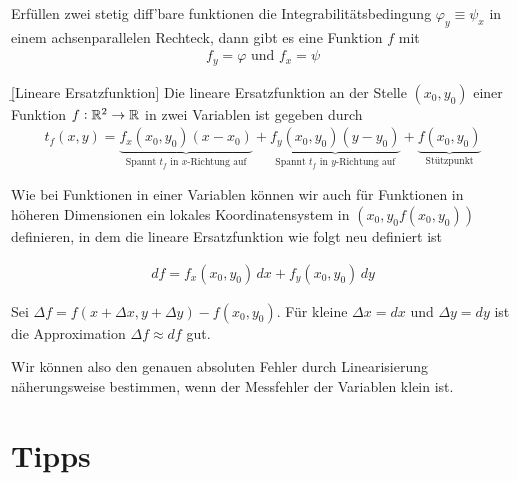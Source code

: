 \documentclass[12pt]{article}
\begin{document}
\begin{fct}
        Erfüllen zwei stetig diff'bare funktionen die Integrabilitätsbedingung $\varphi_y\equiv\psi_x$ in einem achsenparallelen Rechteck, dann gibt es eine Funktion $f$ mit
        \begin{align}
                f_y=\varphi\text{ und }f_x=\psi
        \end{align}
\end{fct}

\begin{defn}{\b{[Lineare Ersatzfunktion]}}
        Die lineare Ersatzfunktion an der Stelle $(x_0,y_0)$ einer Funktion $f:\mathbb{R}^2\to\mathbb{R}$ in zwei Variablen ist gegeben durch
        \begin{align}
                t_f(x,y)=\underbrace{f_x(x_0,y_0)(x-x_0)}_{\text{Spannt $t_f$ in $x$-Richtung auf}}+\underbrace{f_y(x_0,y_0)(y-y_0)}_{\text{Spannt $t_f$ in $y$-Richtung auf}}+\underbrace{f(x_0,y_0)}_{\text{Stützpunkt}}
        \end{align}
\end{defn}

Wie bei Funktionen in einer Variablen können wir auch für Funktionen in höheren
Dimensionen ein lokales Koordinatensystem in $(x_0,y_0f(x_0,y_0))$ definieren,
in dem die lineare Ersatzfunktion wie folgt neu definiert ist\vspace*{0.3em}

\begin{thmb}{}
        \begin{align}
                df = f_x(x_0,y_0)\,dx+f_y(x_0,y_0)\,dy
        \end{align}
\end{thmb}\vspace*{1em}

\begin{fct}
        Sei $\Delta f=f(x+\Delta x,y+\Delta y)-f(x_0,y_0)$. Für kleine $\Delta x = dx$ und $\Delta y = dy$ ist die Approximation $\Delta f \approx df$ gut.
\end{fct}

Wir können also den genauen absoluten Fehler durch Linearisierung
näherungs\-weise bestimmen, wenn der Messfehler der Variablen klein ist.

\section{Tipps}
\setcounter{nexc}{1}
\end{document}
